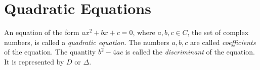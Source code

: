 \chapter{Quadratic Equations}
An equation of the form $ax^2 + bx + c = 0$, where $a, b, c\in C$, the set of complex numbers, is called a \textit{quadratic
  equation}. The numbers $a, b, c$ are called \textit{coefficients} of the equation. The quantity $b^2 - 4ac$ is called the
\textit{discriminant} of the equation. It is represented by $D$ or $\Delta$.
